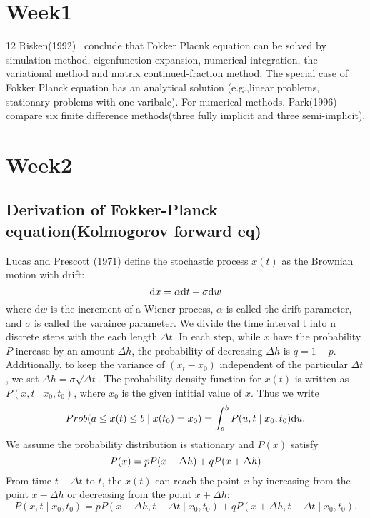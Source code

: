 \documentclass{article}
\def\dd{\mathrm{d}}
\numberwithin{equation}{section}
\begin{document}
\maketitle
\thispagestyle{firstpage} 
\section*{Week1}
12
Risken(1992)~\cite{Risken1992} conclude that Fokker Placnk equation can be solved by simulation method, eigenfunction expansion, 
numerical integration, the variational method and matrix continued-fraction method.
The special case of Fokker Planck equation has an analytical solution (e.g.,linear problems, stationary problems with one varibale).
For numerical methods, Park(1996)~\cite{Park_1996} compare six finite difference methods(three fully implicit and three semi-implicit).

\section*{Week2}
\subsection*{Derivation of Fokker-Planck equation(Kolmogorov forward eq)}
Lucas and Prescott (1971) \cite{Lucas_1971} define the stochastic process $x(t)$ as the Brownian motion with drift:
\begin{equation}\notag
    \dd x = \alpha \dd t + \sigma \dd w
\end{equation}
where $\dd w$ is the increment of a Wiener process, $\alpha$ is called the drift parameter, and 
$\sigma$ is called the varaince parameter. We divide the time interval t into n discrete steps with the each length $\Delta t$. In each 
step, while $x$ have the probability $P$ increase by an amount $\Delta h$, the probability of decreasing $\Delta h$ is $q=1-p$. 
Additionally, to keep the variance of $(x_t - x_0)$ independent of the particular $\Delta t$, we set $\Delta h =\sigma \sqrt{\Delta t}$.
The probability density function for $x(t)$ is written as $P( x,t \mid x_0,t_0)$, where $x_0$ is the given intitial value of $x$. Thus we write 
\begin{equation}\notag
    Prob(a\leq x(t) \leq b \mid x(t_0)=x_0) = \int_{a}^{b} P( u , t \mid x_0,t_0) \dd u.
\end{equation}
We assume the probability distribution is stationary and $P(x)$ satisfy
\begin{equation}\notag
    P(x)=p P(x-\Delta h) + q P(x+\Delta h)
\end{equation}
From time $t-\Delta t$ to $t$, the $x(t)$ can reach the point $x$ by increasing from the point $x- \Delta h$ or decreasing from the 
point $x+\Delta h$:
\begin{equation}\label{1}
    P( x,t \mid x_0,t_0)= p P( x-\Delta h,t -\Delta t \mid x_0,t_0) + q P( x+\Delta h,t-\Delta t \mid x_0,t_0).
\end{equation}
\end{document}
